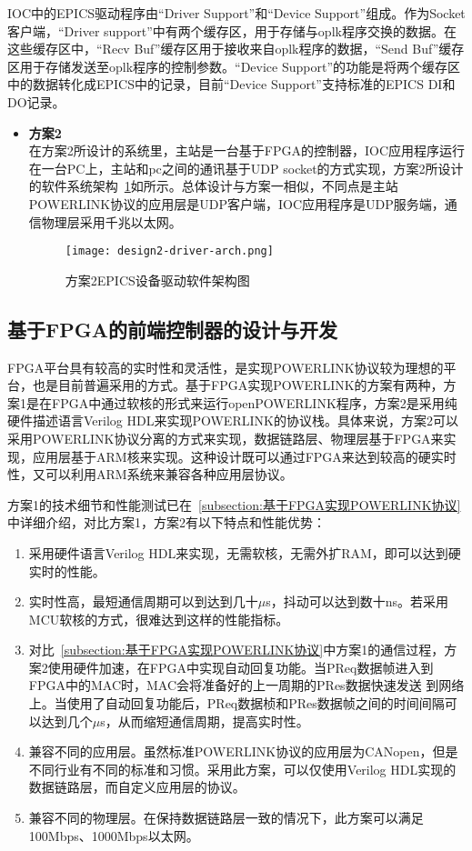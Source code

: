 IOC中的EPICS驱动程序由“Driver Support”和“Device Support”组成。作为Socket客户端，“Driver support”中有两个缓存区，用于存储与oplk程序交换的数据。在这些缓存区中，“Recv Buf”缓存区用于接收来自oplk程序的数据，“Send Buf”缓存区用于存储发送至oplk程序的控制参数。“Device Support”的功能是将两个缓存区中的数据转化成EPICS中的记录，目前“Device Support”支持标准的EPICS DI和DO记录。

\begin{itemize}

\item \textbf{方案2} \\ 
在方案2所设计的系统里，主站是一台基于FPGA的控制器，IOC应用程序运行在一台PC上，主站和pc之间的通讯基于UDP socket的方式实现，方案2所设计的软件系统架构~\ref{fig:design2-driver-arch}如所示。总体设计与方案一相似，不同点是主站POWERLINK协议的应用层是UDP客户端，IOC应用程序是UDP服务端，通信物理层采用千兆以太网。

\begin{figure}[!htb]
  \centering
  \texttt{[image: design2-driver-arch.png]}
  \caption{方案2EPICS设备驱动软件架构图}
  \label{fig:design2-driver-arch}
\end{figure}

\end{itemize}

\subsection{基于FPGA的前端控制器的设计与开发}

FPGA平台具有较高的实时性和灵活性，是实现POWERLINK协议较为理想的平台，也是目前普遍采用的方式。基于FPGA实现POWERLINK的方案有两种，方案1是在FPGA中通过软核的形式来运行openPOWERLINK程序，方案2是采用纯硬件描述语言Verilog HDL来实现POWERLINK的协议栈。具体来说，方案2可以采用POWERLINK协议分离的方式来实现，数据链路层、物理层基于FPGA来实现，应用层基于ARM核来实现。这种设计既可以通过FPGA来达到较高的硬实时性，又可以利用ARM系统来兼容各种应用层协议。

方案1的技术细节和性能测试已在~\ref{subsection:基于FPGA实现POWERLINK协议}中详细介绍，对比方案1，方案2有以下特点和性能优势：

\begin{enumerate}
  \item 采用硬件语言Verilog HDL来实现，无需软核，无需外扩RAM，即可以达到硬实时的性能。
  \item 实时性高，最短通信周期可以到达到几十$\mu$s，抖动可以达到数十ns。若采用MCU软核的方式，很难达到这样的性能指标。
  \item 对比~\ref{subsection:基于FPGA实现POWERLINK协议}中方案1的通信过程，方案2使用硬件加速，在FPGA中实现自动回复功能。当PReq数据帧进入到FPGA中的MAC时，MAC会将准备好的上一周期的PRes数据快速发送 到网络上。当使用了自动回复功能后，PReq数据桢和PRes数据帧之间的时间间隔可以达到几个$\mu$s，从而缩短通信周期，提高实时性。
  \item 兼容不同的应用层。虽然标准POWERLINK协议的应用层为CANopen，但是不同行业有不同的标准和习惯。采用此方案，可以仅使用Verilog HDL实现的数据链路层，而自定义应用层的协议。
  \item 兼容不同的物理层。在保持数据链路层一致的情况下，此方案可以满足100Mbps、1000Mbps以太网。
\end{enumerate}

